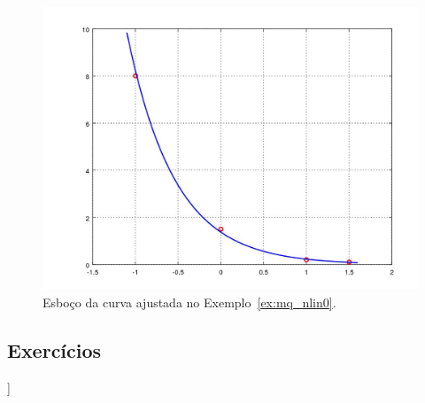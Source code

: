 \begin{ex}
\begin{figure}[h]
  \centering
  \includegraphics[width=\textwidth]{cap_ajuste/dados/ex_mq_nlin0/ex_mq_nlin0}
  \caption{Esboço da curva ajustada no Exemplo~\ref{ex:mq_nlin0}.}
  \label{fig:ex_mq_nlin0}
\end{figure}





\end{ex}

\subsection*{Exercícios}

\begin{flushleft}
  [[tag:revisar]]
\end{flushleft}


